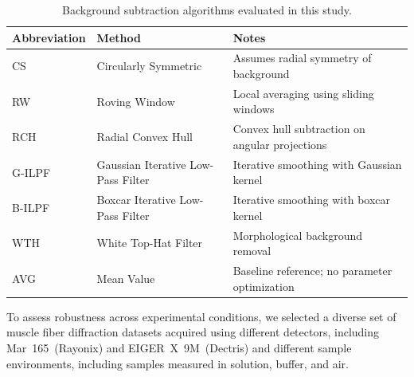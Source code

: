 \documentclass[iucr]{iucrjournals}
\begin{document}
\begin{table}[t]
\caption{Background subtraction algorithms evaluated in this study.}
\label{tab:algorithms}
\centering
\small
\setlength{\tabcolsep}{6pt}
\renewcommand{\arraystretch}{1.1}
\begin{tabular}{@{}lll@{}}
\toprule
\textbf{Abbreviation} & \textbf{Method} & \textbf{Notes} \\
\midrule
CS & Circularly Symmetric & Assumes radial symmetry of background \\
RW & Roving Window & Local averaging using sliding windows \\
RCH & Radial Convex Hull & Convex hull subtraction on angular projections \\
G-ILPF & Gaussian Iterative Low-Pass Filter & Iterative smoothing with Gaussian kernel \\
B-ILPF & Boxcar Iterative Low-Pass Filter & Iterative smoothing with boxcar kernel \\
WTH & White Top-Hat Filter & Morphological background removal \\
AVG & Mean Value & Baseline reference; no parameter optimization \\
\bottomrule
\end{tabular}
\end{table}


To assess robustness across experimental conditions, we selected a diverse set of muscle fiber diffraction datasets acquired using different detectors, including Mar~165~(Rayonix) and EIGER~X~9M~(Dectris) and different sample environments, including samples measured in solution, buffer, and air.

\end{document}
